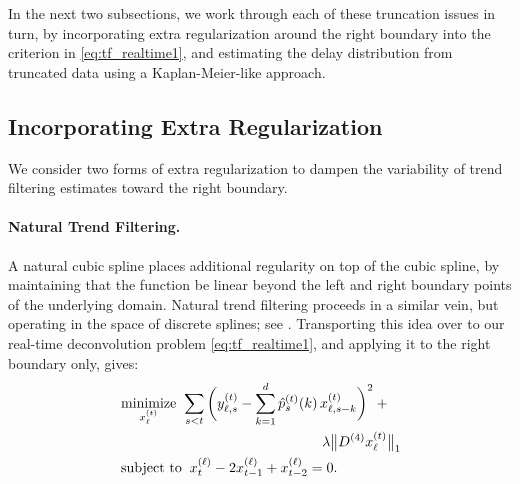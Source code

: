 \documentclass[sts]{imsart}
\newcommand{\minimize}{\mathop{\mathrm{minimize}}}
\newcommand{\subjectto}{\mathop{\mathrm{subject\,\,to}}}
\def\hp{\hat{p}}
\theoremstyle{plain}
\theoremstyle{definition}
\theoremstyle{remark}
\begin{document}
In the next two subsections, we work through each of these truncation issues in
turn, by incorporating extra regularization around the right boundary into the  
criterion in \eqref{eq:tf_realtime1}, and estimating the delay distribution
from truncated data using a Kaplan-Meier-like approach. 

\subsection{Incorporating Extra Regularization}
\label{sec:extra_regularization}

We consider two forms of extra regularization to dampen the variability of trend
filtering estimates toward the right boundary. 

\smallskip
\paragraph*{Natural Trend Filtering.}

A natural cubic spline places additional regularity on top of the cubic spline,
by maintaining that the function be linear beyond the left and right boundary
points of the underlying domain. Natural trend filtering proceeds in a similar
vein, but operating in the space of discrete splines; see
\citet{tibshirani2020divided}. Transporting this idea over to our real-time  
deconvolution problem \eqref{eq:tf_realtime1}, and applying it to the right
boundary only, gives:
\begin{equation}
\label{eq:tf_realtime2}
\begin{alignedat}{2}
&\minimize_{x^{(t)}_\ell} \; && \sum_{s < t} \bigg( y^{(t)}_{\ell,s} -
\sum_{k=1}^d \hp^{(t)}_s(k) \, x^{(t)}_{\ell, s-k} \bigg)^2 +{} \\  
& && \hspace{100pt} \hfill
\lambda \big\|D^{(4)}  x^{(t)}_\ell \big\|_1 \\
&\subjectto && \;\; x^{(\ell)}_t - 2x^{(\ell)}_{t-1} + x^{(\ell)}_{t-2} = 0.
\end{alignedat}
\end{equation}
\end{document}
